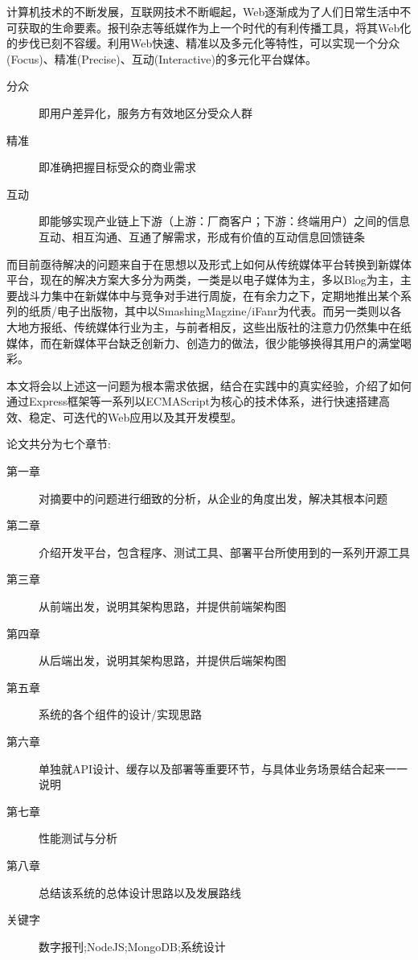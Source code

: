 
\noindent
计算机技术的不断发展，互联网技术不断崛起，Web逐渐成为了人们日常生活中不可获取的生命要素。报刊杂志等纸媒作为上一个时代的有利传播工具，将其Web化的步伐已刻不容缓。利用Web快速、精准以及多元化等特性，可以实现一个分众(Focus)、精准(Precise)、互动(Interactive)的多元化平台媒体。

\begin{description}
 	\item[分众] 即用户差异化，服务方有效地区分受众人群
	\item[精准] 即准确把握目标受众的商业需求
	\item[互动] 即能够实现产业链上下游（上游：厂商客户；下游：终端用户）之间的信息互动、相互沟通、互通了解需求，形成有价值的互动信息回馈链条
\end{description}

\indent
而目前亟待解决的问题来自于在思想以及形式上如何从传统媒体平台转换到新媒体平台，现在的解决方案大多分为两类，一类是以电子媒体为主，多以Blog为主，主要战斗力集中在新媒体中与竞争对手进行周旋，在有余力之下，定期地推出某个系列的纸质/电子出版物，其中以SmashingMagzine/iFanr为代表。而另一类则以各大地方报纸、传统媒体行业为主，与前者相反，这些出版社的注意力仍然集中在纸媒体，而在新媒体平台缺乏创新力、创造力的做法，很少能够换得其用户的满堂喝彩。

\indent
本文将会以上述这一问题为根本需求依据，结合在实践中的真实经验，介绍了如何通过Express框架等一系列以ECMAScript为核心的技术体系，进行快速搭建高效、稳定、可迭代的Web应用以及其开发模型。

\clearpage
\noindent
论文共分为七个章节:

\begin{description}
	\item[第一章] 对摘要中的问题进行细致的分析，从企业的角度出发，解决其根本问题
	\item[第二章] 介绍开发平台，包含程序、测试工具、部署平台所使用到的一系列开源工具
	\item[第三章] 从前端出发，说明其架构思路，并提供前端架构图
	\item[第四章] 从后端出发，说明其架构思路，并提供后端架构图
	\item[第五章] 系统的各个组件的设计/实现思路
	\item[第六章] 单独就API设计、缓存以及部署等重要环节，与具体业务场景结合起来一一说明
	\item[第七章] 性能测试与分析
	\item[第八章] 总结该系统的总体设计思路以及发展路线
 	\item[关键字] 数字报刊;NodeJS;MongoDB;系统设计
\end{description}

\clearpage